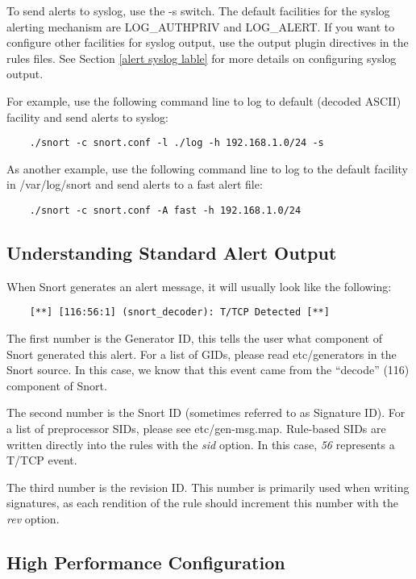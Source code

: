 \documentclass[english]{report}
\begin{document}
To send alerts to syslog, use the -s switch. The default facilities for the
syslog alerting mechanism are LOG\_AUTHPRIV and LOG\_ALERT.  If you want to
configure other facilities for syslog output, use the output plugin directives
in the rules files. See Section \ref{alert syslog lable} for more details on
configuring syslog output.

For example, use the following command line to log to default (decoded ASCII)
facility and send alerts to syslog: 

\begin{verbatim}
    ./snort -c snort.conf -l ./log -h 192.168.1.0/24 -s
\end{verbatim}

As another example, use the following command line to log to the default
facility in /var/log/snort and send alerts to a fast alert file: 

\begin{verbatim}
    ./snort -c snort.conf -A fast -h 192.168.1.0/24
\end{verbatim}

\subsection{Understanding Standard Alert Output}

When Snort generates an alert message, it will usually look like the following:
 
\begin{verbatim}	 
    [**] [116:56:1] (snort_decoder): T/TCP Detected [**]
\end{verbatim}
  	 
The first number is the Generator ID, this tells the user what component of
Snort generated this alert. For a list of GIDs, please read etc/generators in
the Snort source. In this case, we know that this event came from the
``decode'' (116) component of Snort.
  	 
The second number is the Snort ID (sometimes referred to as Signature ID).
For a list of preprocessor SIDs, please see etc/gen-msg.map.  Rule-based SIDs
are written directly into the rules with the \emph{sid} option. In this case,
\emph{56} represents a T/TCP event.
  	 
The third number is the revision ID. This number is primarily used when
writing signatures, as each rendition of the rule should increment this number
with the \emph{rev} option.

\subsection{High Performance Configuration}
\end{document}

